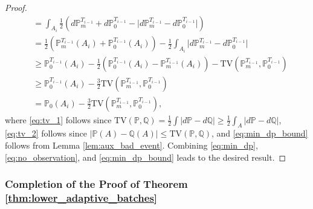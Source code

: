 \documentclass[10pt]{article}
\begin{document}
\begin{proof}
\begin{align}
        & = \int_{A_i} \frac{1}{2} (d\mathbb{P}_m^{T_{i-1}} + d\mathbb{P}_0^{T_{i-1}} - \lvert d\mathbb{P}_m^{T_{i-1}} - d\mathbb{P}_0^{T_{i-1}} \rvert) \\
        & = \frac{1}{2} (\mathbb{P}_m^{T_{i-1}}(A_i) + \mathbb{P}_0^{T_{i-1}}(A_i)) - \frac{1}{2}\int_{A_i} \lvert d\mathbb{P}_m^{T_{i-1}} - d\mathbb{P}_0^{T_{i-1}} \rvert \\
        & \geq \mathbb{P}_0^{T_{i-1}}(A_i) - \frac{1}{2} (\mathbb{P}_0^{T_{i-1}}(A_i) - \mathbb{P}_m^{T_{i-1}}(A_i)) - \mathrm{TV}(\mathbb{P}_m^{T_{i-1}}, \mathbb{P}_0^{T_{i-1}}) \label{eq:tv_1} \\
        & \geq \mathbb{P}_0^{T_{i-1}}(A_i) - \frac{3}{2} \mathrm{TV}(\mathbb{P}_m^{T_{i-1}}, \mathbb{P}_0^{T_{i-1}}) \label{eq:tv_2} \\
        & = \mathbb{P}_0(A_i) - \frac{3}{2} \mathrm{TV}(\mathbb{P}_m^{T_{i-1}}, \mathbb{P}_0^{T_{i-1}}) \label{eq:min_dp_bound},
    \end{align}
    where \eqref{eq:tv_1} follows since $\mathrm{TV}(\mathbb{P}, \mathbb{Q}) = \frac{1}{2}\int\lvert d\mathbb{P} - d\mathbb{Q} \rvert \geq \frac{1}{2}\int_A \lvert d\mathbb{P} - d\mathbb{Q} \rvert $, \eqref{eq:tv_2} follows since $ \lvert \mathbb{P}(A)-\mathbb{Q}(A) \rvert \leq \mathrm{TV}\left(\mathbb{P}, \mathbb{Q}\right) $, and \eqref{eq:min_dp_bound} follows from Lemma \ref{lem:aux_bad_event}. Combining \eqref{eq:min_dp}, \eqref{eq:no_observation}, and \eqref{eq:min_dp_bound} leads to the desired result.
\end{proof}

\subsubsection{Completion of the Proof of Theorem \ref{thm:lower_adaptive_batches}}
\label{app:proof_thm_2}
\end{document}
